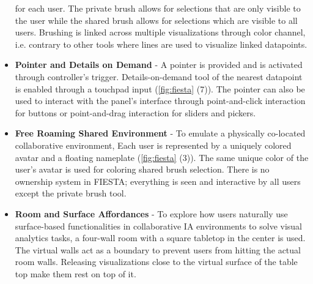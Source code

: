 \documentclass{vgtc}                          %
\begin{document}
\begin{itemize}
	      for each user. The private brush allows for selections that are only
	      visible to the user while the shared brush allows for selections
	      which are visible to all users. Brushing is linked across multiple
	      visualizations through color channel, i.e. contrary to other tools
	      where lines are used to visualize linked datapoints.
	\item \textbf{Pointer and Details on Demand} - A pointer is provided and is
	      activated through controller's trigger. Details-on-demand tool of the
	      nearest datapoint is enabled through a touchpad input
	      (\cref{fig:fiesta} (7)). The pointer can also be used to interact
	      with the panel's interface through point-and-click interaction for
	      buttons or point-and-drag interaction for sliders and pickers.
	\item \textbf{Free Roaming Shared Environment} - To emulate a physically
	      co-located collaborative environment, Each user is represented by a
	      uniquely colored avatar and a floating nameplate
	      (\cref{fig:fiesta} (3)). The same unique color of the user's avatar
	      is used for coloring shared brush selection. There is no ownership
	      system in FIESTA; everything is seen and interactive by all users
	      except the private brush tool.
	\item \textbf{Room and Surface Affordances} - To explore how users
	      naturally use surface-based functionalities in collaborative IA
	      environments to solve visual analytics tasks, a four-wall room with
	      a square tabletop in the center is used. The virtual walls act as a
	      boundary to prevent users from hitting the actual room walls.
	      Releasing visualizations close to the virtual surface of the table
	      top make them rest on top of it.
\end{itemize}

\medskip
\end{document}
